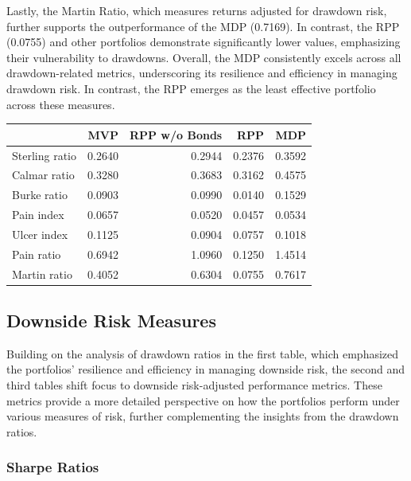 \documentclass[11pt,preprint]{elsarticle}
\let\origtable\table
\let\endorigtable\endtable
\renewenvironment{table}[1][2] {
    \expandafter\origtable\expandafter[H]
} {
    \endorigtable
}
\numberwithin{equation}{section}
\numberwithin{figure}{section}
\numberwithin{table}{section}
\begin{document}
Lastly, the Martin Ratio, which measures returns adjusted for drawdown
risk, further supports the outperformance of the MDP (0.7169). In
contrast, the RPP (0.0755) and other portfolios demonstrate
significantly lower values, emphasizing their vulnerability to
drawdowns. Overall, the MDP consistently excels across all
drawdown-related metrics, underscoring its resilience and efficiency in
managing drawdown risk. In contrast, the RPP emerges as the least
effective portfolio across these measures.

\begin{table}
\centering
\caption{\label{tab:drawdowns-ratio}Drawdowns ratio table}
\centering
\begin{tabular}[t]{l|r|r|r|r}
\hline
  & MVP & RPP w/o Bonds & RPP & MDP\\
\hline
Sterling ratio & 0.2640 & 0.2944 & 0.2376 & 0.3592\\
\hline
Calmar ratio & 0.3280 & 0.3683 & 0.3162 & 0.4575\\
\hline
Burke ratio & 0.0903 & 0.0990 & 0.0140 & 0.1529\\
\hline
Pain index & 0.0657 & 0.0520 & 0.0457 & 0.0534\\
\hline
Ulcer index & 0.1125 & 0.0904 & 0.0757 & 0.1018\\
\hline
Pain ratio & 0.6942 & 1.0960 & 0.1250 & 1.4514\\
\hline
Martin ratio & 0.4052 & 0.6304 & 0.0755 & 0.7617\\
\hline
\end{tabular}
\end{table}

\subsection{Downside Risk Measures}\label{downside-risk-measures}

Building on the analysis of drawdown ratios in the first table, which
emphasized the portfolios' resilience and efficiency in managing
downside risk, the second and third tables shift focus to downside
risk-adjusted performance metrics. These metrics provide a more detailed
perspective on how the portfolios perform under various measures of
risk, further complementing the insights from the drawdown ratios.

\subsubsection{Sharpe Ratios}\label{sharpe-ratios}
\end{document}
